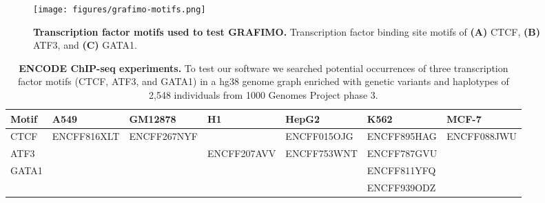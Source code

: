 \documentclass[a4paper, titlepage, openright]{book}
\newcommand{\grafimo}{GRAFIMO\xspace}
\begin{document}
\begin{figure}
    \centering
    \texttt{[image: figures/grafimo-motifs.png]}
    \caption[Transcription factor motifs used to test \grafimo]{\textbf{Transcription factor motifs used to test \grafimo.} Transcription factor binding site motifs of \textbf{(A)} CTCF, \textbf{(B)} ATF3, and \textbf{(C)} GATA1.}
    \label{fig:grafimo-motifs}
\end{figure}

\begin{table}
    \begin{adjustwidth}{-.5in}{-.5in}
        \begin{center}
            \begin{tabular}{|p{1.1cm}|p{2.5cm}|p{2.5cm}|p{2.5cm}|p{2.5cm}|p{2.5cm}|p{2.5cm}|}
                \hline
                \textbf{Motif} & \textbf{A549} & \textbf{GM12878} & \textbf{H1} & \textbf{HepG2} & \textbf{K562} & \textbf{MCF-7}\\
                \hline
                 CTCF & ENCFF816XLT & ENCFF267NYF & & ENCFF015OJG & ENCFF895HAG & ENCFF088JWU\\
                 \hline
                 ATF3 & & & ENCFF207AVV & ENCFF753WNT & ENCFF787GVU & \\
                 \hline
                 GATA1 & & & & & ENCFF811YFQ & \\
                 & & & & & ENCFF939ODZ & \\
                 \hline
            \end{tabular}
            \caption[ENCODE ChIP-seq experiments]{\textbf{ENCODE ChIP-seq experiments.} To test our software we searched potential occurrences of three transcription factor motifs (CTCF, ATF3, and GATA1) in a hg38 genome graph enriched with genetic variants and haplotypes of 2,548 individuals from 1000 Genomes Project phase 3.}
            \label{tab:table-encode-experiment}
        \end{center}
    \end{adjustwidth}
\end{table}

\end{document}
